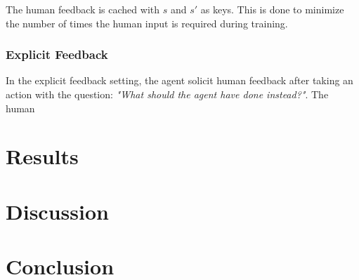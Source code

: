 \documentclass[conference]{IEEEtran}
\begin{document}
The human feedback is cached with \(s\) and \(s'\) as keys. This is done to minimize the number of times the human input is required during training.

\subsubsection{Explicit Feedback}

In the explicit feedback setting, the agent solicit human feedback after taking an action with the question: \textit{"What should the agent have done instead?"}. The human 





\section{Results}


\section{Discussion}

\section{Conclusion}



\end{document}
